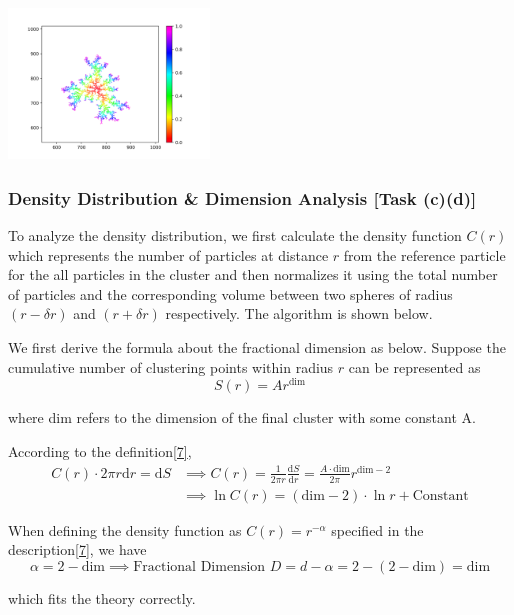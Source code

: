 \documentclass[10pt]{article}
\begin{document}
\begin{center}
	\includegraphics[width=0.4\textwidth]{Figure_3}
\end{center}

\subsubsection{Density Distribution \& Dimension Analysis [Task (c)(d)]}

To analyze the density distribution, we first calculate the density function $C(r)$ which represents the number of particles at distance $r$ from the reference particle for the all particles in the cluster and then normalizes it using the total number of particles and the corresponding volume between two spheres of radius $(r-\delta r)$ and $(r+\delta r)$ respectively. The algorithm is shown below.

We first derive the formula about the fractional dimension as below. Suppose the cumulative number of clustering points within radius $r$ can be represented as
$$
S(r) = A r^{\text{dim}}
$$

where dim refers to the dimension of the final cluster with some constant A.

According to the definition\hyperref[ref7]{[7]},
$$
\begin{aligned}
	C(r) \cdot 2 \pi r \mathrm{d} r = \mathrm{d} S &\implies C(r) = \frac{1}{2 \pi r}\frac{\mathrm{d} S}{\mathrm{d} r} = \frac{A \cdot \text{dim}}{2 \pi} r^{\mathrm{dim} - 2}\\
	&\implies \ln C(r) = (\mathrm{dim} - 2) \cdot \ln r + \text{Constant}
\end{aligned}
$$

When defining the density function as $C(r) = r^{-\alpha}$ specified in the description\hyperref[ref7]{[7]}, we have
$$
\alpha = 2-\text{dim} \implies \text{Fractional Dimension } D = d-\alpha = 2-(2-\text{dim}) = \text{dim}
$$

which fits the theory correctly.
\end{document}

